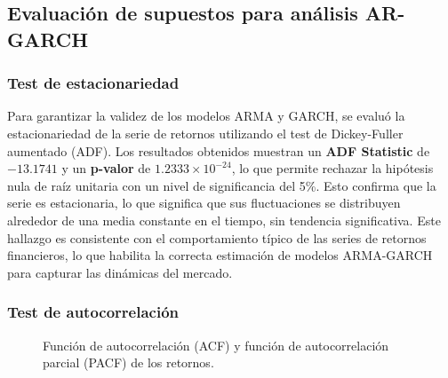\documentclass[
  number,
  preprint,
  3p,
  onecolumn]{elsarticle}
\begin{document}
\subsection{Evaluación de supuestos para análisis
AR-GARCH}\label{evaluaciuxf3n-de-supuestos-para-anuxe1lisis-ar-garch}

\subsubsection{Test de estacionariedad}\label{sec-estacionariedad}

Para garantizar la validez de los modelos ARMA y GARCH, se evaluó la
estacionariedad de la serie de retornos utilizando el test de
Dickey-Fuller aumentado (ADF). Los resultados obtenidos muestran un
\textbf{ADF Statistic} de \(-13.1741\) y un \textbf{p-valor} de
\(1.2333 \times 10^{-24}\), lo que permite rechazar la hipótesis nula de
raíz unitaria con un nivel de significancia del 5\%. Esto confirma que
la serie es estacionaria, lo que significa que sus fluctuaciones se
distribuyen alrededor de una media constante en el tiempo, sin tendencia
significativa. Este hallazgo es consistente con el comportamiento típico
de las series de retornos financieros, lo que habilita la correcta
estimación de modelos ARMA-GARCH para capturar las dinámicas del
mercado.

\subsubsection{Test de autocorrelación}\label{sec-autocorrelacion}

\begin{figure}[H]


\caption{\label{fig-acf-pacf}Función de autocorrelación (ACF) y función
de autocorrelación parcial (PACF) de los retornos.}

\end{figure}%
\end{document}
